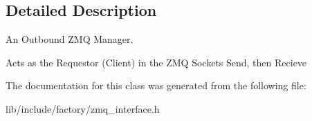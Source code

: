 \subsection{Detailed Description}
An Outbound Z\-M\-Q Manager. 

Acts as the Requestor (Client) in the Z\-M\-Q Sockets Send, then Recieve 

The documentation for this class was generated from the following file\-:\begin{DoxyCompactItemize}
\item 
lib/include/factory/zmq\-\_\-interface.\-h\end{DoxyCompactItemize}
